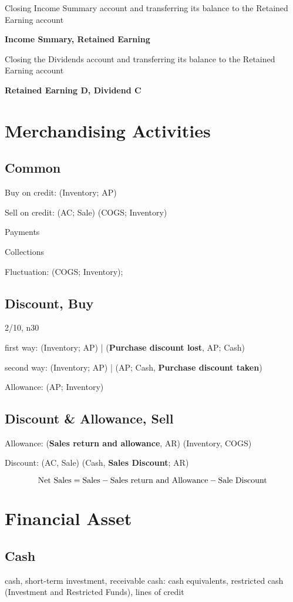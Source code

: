\documentclass[10pt, a4paper]{article}
\begin{document}
Closing Income Summary account and transferring its balance to the Retained Earning account 

\textbf{Income Smmary, Retained Earning}

Closing the Dividends account and transferring its balance to the Retained Earning account

\textbf{Retained Earning D, Dividend C}

\section* {Merchandising Activities}
\subsection*{Common}
    Buy on credit: (Inventory; AP)

    Sell on credit: (AC; Sale) (COGS; Inventory)

    Payments

    Collections

    Fluctuation: (COGS; Inventory); 
\subsection*{Discount, Buy}
    2/10, n30 

    first way: (Inventory; AP) | (\textbf{Purchase discount lost}, AP; Cash)

    second way: (Inventory; AP) | (AP; Cash, \textbf{Purchase discount taken})

    Allowance:  (AP; Inventory)

\subsection*{Discount \& Allowance, Sell}
    Allowance: (\textbf{Sales return and allowance}, AR) (Inventory, COGS)
    
    Discount: (AC, Sale) (Cash, \textbf{Sales Discount}; AR) 
    
    $$\rm{Net\ Sales} = \rm{Sales} - \rm{Sales\ return\ and\ Allowance} - \rm{Sale\ Discount}$$

\section*{Financial Asset}
\subsection*{Cash}
    cash, short-term investment, receivable 
    cash: cash equivalents, restricted cash (Investment and Restricted Funds), lines of credit
\end{document}
